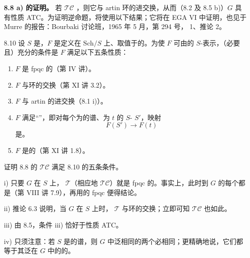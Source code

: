 \textbf{8.8 a) 的证明。} 若 $\mathcal{TC}$ ，则它与 artin 环的进交换，从而（8.2 及 8.5 b)）$G$ 具有性质 ATC。为证明逆命题，将使用以下结果；它将在 EGA VI 中证明，也见于 Murre 的报告：Bourbaki 讨论班，1965 年 5 月，第 294 号， 1、推论 2。
\begin{SGAresult}{}{8.10}
设 $S$ 是，$F$ 是定义在 $\mathrm{Sch}/S$ 上、取值于的。为使 $F$ 可由的 $S$-表示，（必要且）充分的条件是 $F$ 满足以下五条性质：
\begin{enumerate}
\item[i)] $F$ 是 fpqc 的（第 IV 讲）。
\item[ii)] $F$ 与环的交换（第 XI 讲 3.2）。
\item[iii)] $F$ 与 artin 的进交换（8.1 i)）。
\item[iv)] $F$ 满足“”，即对每个为的谱、为 $t$ 的 $S$- $S'$，映射
\[F(S')\longrightarrow F(t)\]
是。
\item[v)] $F$ 是的（第 XI 讲 1.8）。
\end{enumerate}
\end{SGAresult}
证明 8.8 的 $\mathcal{TC}$ 满足 8.10 的五条条件。

i) 只要 $G$ 在 $S$ 上， $\mathcal T$（相应地 $\mathcal{TC}$）就是 fpqc 的。事实上，此时到 $G$ 的每个都是（第 VIII 讲 7.9），再用的 fpqc 便得结论。

ii) 推论 6.3 说明，当 $G$ 在 $S$ 上时， $\mathcal T$ 与环的交换；立即可知 $\mathcal{TC}$ 也如此。

iii) 由 8.5，条件 iii) 恰好于性质 ATC。

iv) 只须注意：若 $S$ 是的谱，则 $G$ 中泛相同的两个必相同；更精确地说，它们都等于其泛在 $G$ 中的的。

